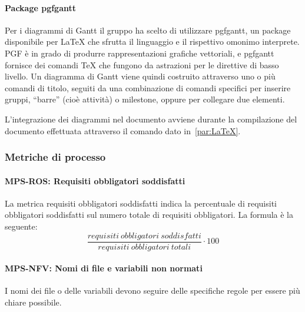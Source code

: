 \documentclass[../../norme-di-progetto.tex]{subfiles}
\begin{document}

\paragraph{Package pgfgantt}%
\label{par:pgfgantt}

Per i diagrammi di Gantt il gruppo ha scelto di utilizzare pgfgantt, un package disponibile per \LaTeX{} che sfrutta il linguaggio  e il rispettivo omonimo interprete.
PGF è in grado di produrre rappresentazioni grafiche vettoriali, e pgfgantt fornisce dei comandi \TeX{} che fungono da astrazioni per le direttive di basso livello.
Un diagramma di Gantt viene quindi costruito attraverso uno o più comandi di titolo, seguiti da una combinazione di comandi specifici per inserire gruppi, ``barre'' (cioè attività) o milestone, oppure per collegare due elementi.

L'integrazione dei diagrammi nel documento avviene durante la compilazione del documento effettuata attraverso il comando dato in~\ref{par:LaTeX}.


\subsubsection{Metriche di processo}%
\label{subs:sviluppo/metriche_di_processo}

\paragraph{MPS-ROS: Requisiti obbligatori soddisfatti}%
\label{par:MPS-ROS_requisiti_obbligatori_soddisfatti}

La metrica requisiti obbligatori soddisfatti indica la percentuale di requisiti obbligatori soddisfatti sul numero totale di requisiti obbligatori. La formula è la seguente:
\[
  \frac{requisiti\ obbligatori\ soddisfatti}{requisiti\ obbligatori\ totali}\cdot 100
\]
\paragraph{MPS-NFV: Nomi di file e variabili non normati}%
\label{par:MPS-NFV_nomi_file_variabili_non_normati}

I nomi dei file o delle variabili devono seguire delle specifiche regole per essere più chiare possibile.
\end{document}
